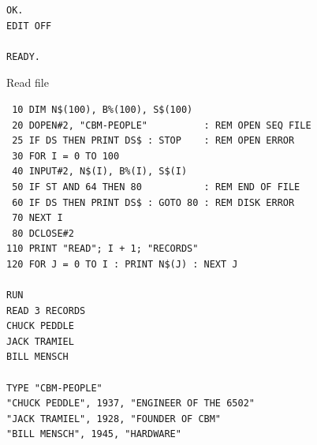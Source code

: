 \begin{description}[leftmargin=2cm,style=nextline]
\begin{tcolorbox}[colback=black,coltext=white]
\begin{verbatim}
OK.
EDIT OFF

READY.
\end{verbatim}
\end{tcolorbox}

                  Read file

\begin{tcolorbox}[colback=black,coltext=white]
\verbatimfont{\codefont}
\begin{verbatim}
 10 DIM N$(100), B%(100), S$(100)
 20 DOPEN#2, "CBM-PEOPLE"          : REM OPEN SEQ FILE
 25 IF DS THEN PRINT DS$ : STOP    : REM OPEN ERROR
 30 FOR I = 0 TO 100
 40 INPUT#2, N$(I), B%(I), S$(I)
 50 IF ST AND 64 THEN 80           : REM END OF FILE
 60 IF DS THEN PRINT DS$ : GOTO 80 : REM DISK ERROR
 70 NEXT I
 80 DCLOSE#2
110 PRINT "READ"; I + 1; "RECORDS"
120 FOR J = 0 TO I : PRINT N$(J) : NEXT J

RUN
READ 3 RECORDS
CHUCK PEDDLE
JACK TRAMIEL
BILL MENSCH

TYPE "CBM-PEOPLE"
"CHUCK PEDDLE", 1937, "ENGINEER OF THE 6502"
"JACK TRAMIEL", 1928, "FOUNDER OF CBM"
"BILL MENSCH", 1945, "HARDWARE"
\end{verbatim}
\end{tcolorbox}
\end{description}


\newpage
